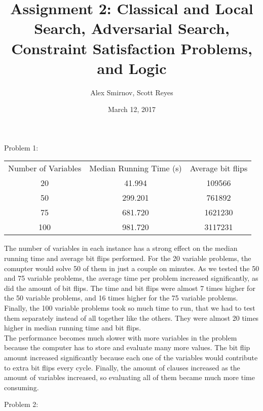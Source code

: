 \documentclass[11pt, oneside]{article}   	%
\title{Assignment 2: Classical and Local Search, Adversarial Search, Constraint Satisfaction Problems, and Logic}
\author{Alex Smirnov, Scott Reyes}
\date{March 12, 2017}							%
\begin{document}
\maketitle
\begin{flushleft}

Problem 1:
\begin{center}
\begin{tabular}{ |c|c|c|} 
\hline
Number of Variables & Median Running Time (s) & Average bit flips \\ 
20 & 41.994 & 109566 \\
50 & 299.201 & 761892 \\
75 & 681.720 & 1621230 \\
100 & 981.720 & 3117231 \\
\hline
\end{tabular}
\end{center}

The number of variables in each instance has a strong effect on the median running time and average bit flips performed. For the 20 variable problems, the comupter would solve 50 of them in just a couple on minutes. As we tested the 50 and 75 variable problems, the average time per problem increased significantly, as did the amount of bit flips. The time and bit flips were almost 7 times higher for the 50 variable problems, and 16 times higher for the 75 variable problems. Finally, the 100 variable problems took so much time to run, that we had to test them separately instead of all together like the others. They were almost 20 times higher in median running time and bit flips. \\\medskip
The performance becomes much slower with more variables in the problem because the computer has to store and evaluate many more values. The bit flip amount increased significantly because each one of the variables would contribute to extra bit flips every cycle. Finally, the amount of clauses increased as the amount of variables increased, so evaluating all of them became much more time consuming.\\\medskip

Problem 2: 

\end{flushleft}
\end{document}
